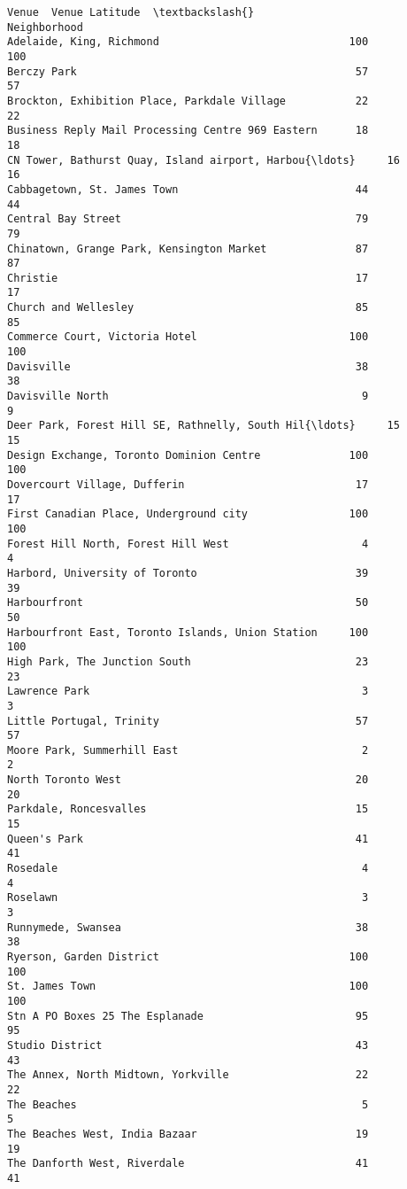\documentclass[11pt]{article}
\begin{document}
\begin{tcolorbox}[breakable, size=fbox, boxrule=.5pt, pad at break*=1mm, opacityfill=0]
\begin{Verbatim}[commandchars=\\\{\}]
                                                    Venue  Venue Latitude  \textbackslash{}
Neighborhood
Adelaide, King, Richmond                              100             100
Berczy Park                                            57              57
Brockton, Exhibition Place, Parkdale Village           22              22
Business Reply Mail Processing Centre 969 Eastern      18              18
CN Tower, Bathurst Quay, Island airport, Harbou{\ldots}     16              16
Cabbagetown, St. James Town                            44              44
Central Bay Street                                     79              79
Chinatown, Grange Park, Kensington Market              87              87
Christie                                               17              17
Church and Wellesley                                   85              85
Commerce Court, Victoria Hotel                        100             100
Davisville                                             38              38
Davisville North                                        9               9
Deer Park, Forest Hill SE, Rathnelly, South Hil{\ldots}     15              15
Design Exchange, Toronto Dominion Centre              100             100
Dovercourt Village, Dufferin                           17              17
First Canadian Place, Underground city                100             100
Forest Hill North, Forest Hill West                     4               4
Harbord, University of Toronto                         39              39
Harbourfront                                           50              50
Harbourfront East, Toronto Islands, Union Station     100             100
High Park, The Junction South                          23              23
Lawrence Park                                           3               3
Little Portugal, Trinity                               57              57
Moore Park, Summerhill East                             2               2
North Toronto West                                     20              20
Parkdale, Roncesvalles                                 15              15
Queen's Park                                           41              41
Rosedale                                                4               4
Roselawn                                                3               3
Runnymede, Swansea                                     38              38
Ryerson, Garden District                              100             100
St. James Town                                        100             100
Stn A PO Boxes 25 The Esplanade                        95              95
Studio District                                        43              43
The Annex, North Midtown, Yorkville                    22              22
The Beaches                                             5               5
The Beaches West, India Bazaar                         19              19
The Danforth West, Riverdale                           41              41


\end{Verbatim}
\end{tcolorbox}
\end{document}
